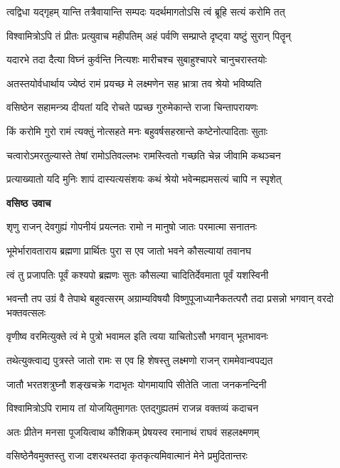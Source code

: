 \twolineshloka
{त्वद्विधा यद्गृहम् यान्ति तत्रैवायान्ति सम्पदः}
{यदर्थमागतोऽसि त्वं ब्रूहि सत्यं करोमि तत्} %

\twolineshloka
{विश्वामित्रोऽपि तं प्रीतः प्रत्युवाच महीपतिम्}
{अहं पर्वणि सम्प्राप्ते दृष्ट्वा यष्टुं सुरान् पितॄन्} %

\twolineshloka
{यदारभे तदा दैत्या विघ्नं कुर्वन्ति नित्यशः}
{मारीचश्च सुबाहुश्चापरे चानुचरास्तयोः} %

\twolineshloka
{अतस्तयोर्वधार्थाय ज्येष्ठं रामं प्रयच्छ मे}
{लक्ष्मणेन सह भ्रात्रा तव श्रेयो भविष्यति} %

\twolineshloka
{वसिष्ठेन सहामन्त्र्य दीयतां यदि रोचते}
{पप्रच्छ गुरुमेकान्ते राजा चिन्तापरायणः} %

\twolineshloka
{किं करोमि गुरो रामं त्यक्तुं नोत्सहते मनः}
{बहुवर्षसहस्रान्ते कष्टेनोत्पादिताः सुताः} %

\twolineshloka
{चत्वारोऽमरतुल्यास्ते तेषां रामोऽतिवल्लभः}
{रामस्त्वितो गच्छति चेन्न जीवामि कथञ्चन} %

\twolineshloka
{प्रत्याख्यातो यदि मुनिः शापं दास्यत्यसंशयः}
{कथं श्रेयो भवेन्मह्यमसत्यं चापि न स्पृशेत्} %

\textbf{वसिष्ठ उवाच}

\twolineshloka
{शृणु राजन् देवगुह्यं गोपनीयं प्रयत्नतः}
{रामो न मानुषो जातः परमात्मा सनातनः} %

\twolineshloka
{भूमेर्भारावताराय ब्रह्मणा प्रार्थितः पुरा}
{स एव जातो भवने कौसल्यायां तवानघ} %

\twolineshloka
{त्वं तु प्रजापतिः पूर्वं कश्यपो ब्रह्मणः सुतः}
{कौसल्या चादितिर्देवमाता पूर्वं यशस्विनी} %

\threelineshloka
{भवन्तौ तप उग्रं वै तेपाथे बहुवत्सरम्}
{अग्राम्यविषयौ विष्णुपूजाध्यानैकतत्परौ}
{तदा प्रसन्नो भगवान् वरदो भक्तवत्सलः} %

\twolineshloka
{वृणीष्व वरमित्युक्ते त्वं मे पुत्रो भवामल}
{इति त्वया याचितोऽसौ भगवान् भूतभावनः} %

\twolineshloka
{तथेत्युक्त्वाद्य पुत्रस्ते जातो रामः स एव हि}
{शेषस्तु लक्ष्मणो राजन् राममेवान्वपद्यत} %

\twolineshloka
{जातौ भरतशत्रुघ्नौ शङ्खचक्रे गदाभृतः}
{योगमायापि सीतेति जाता जनकनन्दिनी} %

\twolineshloka
{विश्वामित्रोऽपि रामाय तां योजयितुमागतः}
{एतद्गुह्यतमं राजन्न वक्तव्यं कदाचन} %

\twolineshloka
{अतः प्रीतेन मनसा पूजयित्वाथ कौशिकम्}
{प्रेषयस्व रमानाथं राघवं सहलक्ष्मणम्} %

\twolineshloka
{वसिष्ठेनैवमुक्तस्तु राजा दशरथस्तदा}
{कृतकृत्यमिवात्मानं मेने प्रमुदितान्तरः} %

